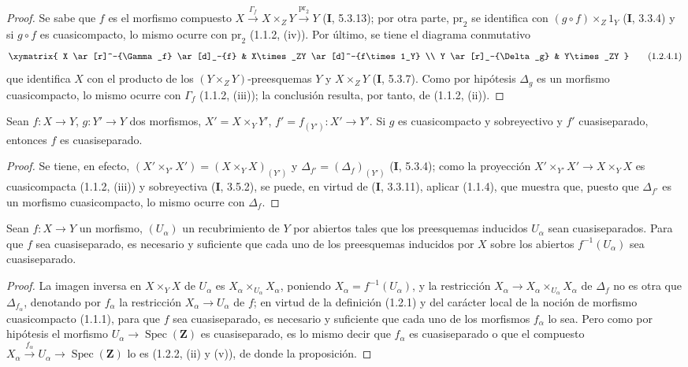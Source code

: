 \begin{proof}
Se sabe que $f$ es el morfismo compuesto
$X\xrightarrow{\Gamma_f}X\times_ZY\xrightarrow{\mathrm{pr}_2}Y$
(\textbf{I}, 5.3.13); por otra parte, $\mathrm{pr}_2$ se identifica con
$(g\circ f)\times_Z1_Y$ (\textbf{I}, 3.3.4) y si $g\circ f$ es cuasicompacto, lo
mismo ocurre con $\mathrm{pr}_2$ (1.1.2, (iv)). Por último, se tiene el diagrama
conmutativo
\[
\xymatrix{
  X \ar[r]^-{\Gamma_f} \ar[d]_-{f} & X\times_ZY
    \ar[d]^-{f\times 1_Y} \\
  Y \ar[r]_-{\Delta_g} & Y\times_ZY
}
\tag{1.2.4.1}
\label{IV.1.2.4.1-fr}
\]
que identifica $X$ con el producto de los $(Y\times_ZY)$-preesquemas $Y$ y
$X\times_ZY$ (\textbf{I}, 5.3.7). Como por hipótesis $\Delta_g$ es un morfismo
cuasicompacto, lo mismo ocurre con $\Gamma_f$ (1.1.2, (iii)); la conclusión
resulta, por tanto, de (1.1.2, (ii)).
\end{proof}

\begin{proposition}[1.2.5]
\label{IV.1.2.5-fr}
Sean $f:X\to Y$, $g:Y'\to Y$ dos morfismos,
$X'=X\times_Y Y'$, $f'=f_{(Y')}:X'\to Y'$. Si $g$ es cuasicompacto y
sobreyectivo y $f'$ cuasiseparado, entonces $f$ es cuasiseparado.
\end{proposition}

\begin{proof}
Se tiene, en efecto, $(X'\times_{Y'}X')=(X\times_YX)_{(Y')}$ y
$\Delta_{f'}=(\Delta_f)_{(Y')}$ (\textbf{I}, 5.3.4); como la proyección
$X'\times_{Y'}X'\to X\times_YX$ es cuasicompacta (1.1.2, (iii)) y
sobreyectiva (\textbf{I}, 3.5.2), se puede, en virtud de (\textbf{I}, 3.3.11), aplicar (1.1.4),
que muestra que, puesto que $\Delta_{f'}$ es un morfismo cuasicompacto, lo
mismo ocurre con $\Delta_f$.
\end{proof}

\begin{proposition}[1.2.6]
\label{IV.1.2.6-fr}
Sean $f:X\to Y$ un morfismo, $(U_\alpha)$ un recubrimiento de $Y$ por
abiertos tales que los preesquemas inducidos $U_\alpha$ sean cuasiseparados. Para
que $f$ sea cuasiseparado, es necesario y suficiente que cada uno de los preesquemas
inducidos por $X$ sobre los abiertos $f^{-1}(U_\alpha)$ sea cuasiseparado.
\end{proposition}

\begin{proof}
La imagen inversa en $X\times_YX$ de $U_\alpha$ es
$X_\alpha\times_{U_\alpha}X_\alpha$, poniendo
$X_\alpha=f^{-1}(U_\alpha)$, y la restricción
$X_\alpha\to X_\alpha\times_{U_\alpha}X_\alpha$ de $\Delta_f$ no es otra
que $\Delta_{f_\alpha}$, denotando por $f_\alpha$ la restricción
$X_\alpha\to U_\alpha$ de $f$; en virtud de la definición (1.2.1) y del
carácter local de la noción de morfismo cuasicompacto (1.1.1), para que $f$
sea cuasiseparado, es necesario y suficiente que cada uno de los morfismos $f_\alpha$
lo sea. Pero como por hipótesis el morfismo
$U_\alpha\to\operatorname{Spec}(\mathbf Z)$ es cuasiseparado, es lo mismo
decir que $f_\alpha$ es cuasiseparado o que el compuesto
$X_\alpha\xrightarrow{f_\alpha}U_\alpha\to\operatorname{Spec}(\mathbf Z)$
lo es (1.2.2, (ii) y (v)), de donde la proposición.
\end{proof}

